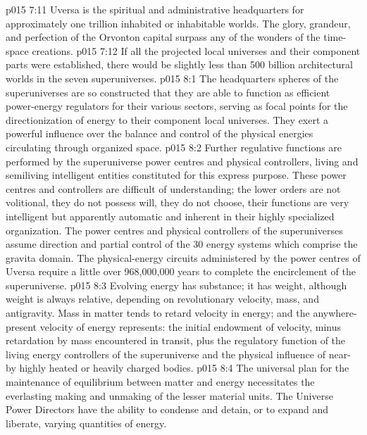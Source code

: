 \vs p015 7:11 Uversa is the spiritual and administrative headquarters for approximately one trillion inhabited or inhabitable worlds. The glory, grandeur, and perfection of the Orvonton capital surpass any of the wonders of the time\hyp{}space creations.
\vs p015 7:12 \pc If all the projected local universes and their component parts were established, there would be slightly less than 500 billion architectural worlds in the seven superuniverses.
\vs p015 8:1 The headquarters spheres of the superuniverses are so constructed that they are able to function as efficient power\hyp{}energy regulators for their various sectors, serving as focal points for the directionization of energy to their component local universes. They exert a powerful influence over the balance and control of the physical energies circulating through organized space.
\vs p015 8:2 Further regulative functions are performed by the superuniverse power centres and physical controllers, living and semiliving intelligent entities constituted for this express purpose. These power centres and controllers are difficult of understanding; the lower orders are not volitional, they do not possess will, they do not choose, their functions are very intelligent but apparently automatic and inherent in their highly specialized organization. The power centres and physical controllers of the superuniverses assume direction and partial control of the 30 energy systems which comprise the gravita domain. The physical\hyp{}energy circuits administered by the power centres of Uversa require a little over 968,000,000 years to complete the encirclement of the superuniverse.
\vs p015 8:3 \pc Evolving energy has substance; it has weight, although weight is always relative, depending on revolutionary velocity, mass, and antigravity. Mass in matter tends to retard velocity in energy; and the anywhere\hyp{}present velocity of energy represents: the initial endowment of velocity, minus retardation by mass encountered in transit, plus the regulatory function of the living energy controllers of the superuniverse and the physical influence of near-by highly heated or heavily charged bodies.
\vs p015 8:4 The universal plan for the maintenance of equilibrium between matter and energy necessitates the everlasting making and unmaking of the lesser material units. The Universe Power Directors have the ability to condense and detain, or to expand and liberate, varying quantities of energy.
